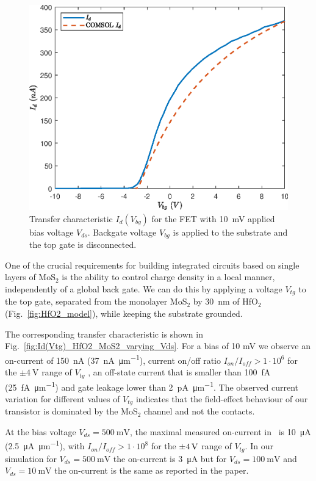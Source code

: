 \documentclass[12pt,a4paper,titlepage]{article}
\begin{document}
\begin{figure}[H]
	\centering
	\includegraphics[width=.75\textwidth]{Grafici/Id(Vbg)_HfO2_MoS2.eps} 
	\caption{Transfer characteristic $I_d(V_{bg})$ for the FET with \SI{10}{\milli \volt} applied bias voltage $V_{ds}$. Backgate voltage $V_{bg}$ is applied to the substrate and the top gate is disconnected.}
	\label{fig:Id(Vbg)_HfO2_MoS2}
\end{figure}

One of the crucial requirements for building integrated circuits based on single layers of MoS$_2$ is the ability to control charge density in a local manner, independently of a global back gate. We can do this by applying a voltage $V_{tg}$ to the top gate, separated from the monolayer MoS$_2$ by \SI{30}{\nano \meter} of HfO$_2$ (Fig.~\ref{fig:HfO2_model}), while keeping the substrate grounded.

The corresponding transfer characteristic is shown in Fig.~\ref{fig:Id(Vtg)_HfO2_MoS2_varying_Vds}. For a bias of 10 mV we observe an on-current of \SI{150}{\nano\ampere} (\SI{37}{\nano\ampere \per \micro \meter}), current on/off ratio $I_{on}/I_{off} > 1 \cdot 10^6$ for the $\pm \SI{4}{\volt}$ range of $V_{tg}$ , an off-state current that is smaller than \SI{100}{\femto\ampere} (\SI{25}{\femto\ampere \per \micro \meter}) and gate leakage lower than \SI{2}{\pico \ampere \per \micro \meter}. The observed current variation for different values of $V_{tg}$ indicates that the field-effect behaviour of our transistor is dominated by the MoS$_2$ channel and not the contacts.

At the bias voltage $V_{ds} = \SI{500}{\milli \volt}$, the maximal measured on-current in~\cite{Radisavljevic:Si_MoS2} is \SI{10}{\micro \ampere} (\SI{2.5}{\micro\ampere \per \micro \meter}), with $I_{on}/I_{off} > 1 \cdot 10^8$ for the $\SI{\pm 4}{\volt}$ range of $V_{tg}$. In our simulation for $V_{ds} = \SI{500}{\milli \volt}$ the on-current is \SI{3}{\micro \ampere} but for  $V_{ds} = \SI{100}{\milli \volt}$ and  $V_{ds} = \SI{10}{\milli \volt}$ the on-current is the same as reported in the paper. 
\end{document}
